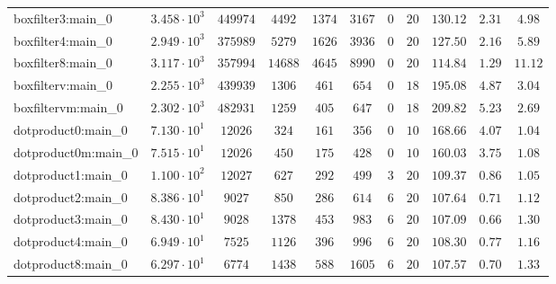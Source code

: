 \begin{tabular}{|l|c|c|c|c|c|c|c|c|c|c|}
boxfilter3:main\_0             & $ 3.458 \cdot 10^{3} $ & $ 449974   $ & $ 4492   $ & $ 1374   $ & $ 3167   $ & $ 0    $ & $ 20   $ & $ 130.12      $ & $ 2.31    $ & $ 4.98    $ \\
boxfilter4:main\_0             & $ 2.949 \cdot 10^{3} $ & $ 375989   $ & $ 5279   $ & $ 1626   $ & $ 3936   $ & $ 0    $ & $ 20   $ & $ 127.50      $ & $ 2.16    $ & $ 5.89    $ \\
boxfilter8:main\_0             & $ 3.117 \cdot 10^{3} $ & $ 357994   $ & $ 14688  $ & $ 4645   $ & $ 8990   $ & $ 0    $ & $ 20   $ & $ 114.84      $ & $ 1.29    $ & $ 11.12   $ \\
boxfilterv:main\_0             & $ 2.255 \cdot 10^{3} $ & $ 439939   $ & $ 1306   $ & $ 461    $ & $ 654    $ & $ 0    $ & $ 18   $ & $ 195.08      $ & $ 4.87    $ & $ 3.04    $ \\
boxfiltervm:main\_0            & $ 2.302 \cdot 10^{3} $ & $ 482931   $ & $ 1259   $ & $ 405    $ & $ 647    $ & $ 0    $ & $ 18   $ & $ 209.82      $ & $ 5.23    $ & $ 2.69    $ \\
dotproduct0:main\_0            & $ 7.130 \cdot 10^{1} $ & $ 12026    $ & $ 324    $ & $ 161    $ & $ 356    $ & $ 0    $ & $ 10   $ & $ 168.66      $ & $ 4.07    $ & $ 1.04    $ \\
dotproduct0m:main\_0           & $ 7.515 \cdot 10^{1} $ & $ 12026    $ & $ 450    $ & $ 175    $ & $ 428    $ & $ 0    $ & $ 10   $ & $ 160.03      $ & $ 3.75    $ & $ 1.08    $ \\
dotproduct1:main\_0            & $ 1.100 \cdot 10^{2} $ & $ 12027    $ & $ 627    $ & $ 292    $ & $ 499    $ & $ 3    $ & $ 20   $ & $ 109.37      $ & $ 0.86    $ & $ 1.05    $ \\
dotproduct2:main\_0            & $ 8.386 \cdot 10^{1} $ & $ 9027     $ & $ 850    $ & $ 286    $ & $ 614    $ & $ 6    $ & $ 20   $ & $ 107.64      $ & $ 0.71    $ & $ 1.12    $ \\
dotproduct3:main\_0            & $ 8.430 \cdot 10^{1} $ & $ 9028     $ & $ 1378   $ & $ 453    $ & $ 983    $ & $ 6    $ & $ 20   $ & $ 107.09      $ & $ 0.66    $ & $ 1.30    $ \\
dotproduct4:main\_0            & $ 6.949 \cdot 10^{1} $ & $ 7525     $ & $ 1126   $ & $ 396    $ & $ 996    $ & $ 6    $ & $ 20   $ & $ 108.30      $ & $ 0.77    $ & $ 1.16    $ \\
dotproduct8:main\_0            & $ 6.297 \cdot 10^{1} $ & $ 6774     $ & $ 1438   $ & $ 588    $ & $ 1605   $ & $ 6    $ & $ 20   $ & $ 107.57      $ & $ 0.70    $ & $ 1.33    $ \\

\end{tabular}
